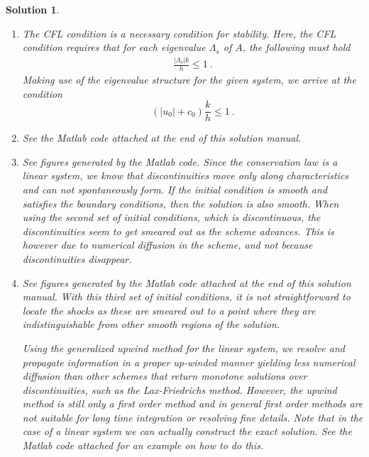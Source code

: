 \documentclass[10pt,letterpaper]{article}
\newcommand{\sqb}[1]{ \left(  {#1} \right) }
\theoremstyle{break}
\newtheorem{mysolution}{Solution}
\newenvironment{solution}{\begin{mysolution}}{\end{mysolution}}
\begin{document}
\begin{solution}
\begin{enumerate}
\begin{gather}
{\begin{array}{cc}
					(\rho_0c_0)^{-1} (-\Lambda_1^+ + \Lambda_2^+)& (\Lambda_1^+ + \Lambda_2^+)
				\end{array}}
		\end{gather}
		and
		\begin{gather}
			A^{-}=S\Lambda^{-}S^{-1}
				=\frac{1}{2}\sqb{\begin{array}{cc}
					(\Lambda_1^- + \Lambda_2^-) & \rho_{0}c_{0} (-\Lambda_1^- + \Lambda_2^-)\\
					(\rho_0c_0)^{-1} (-\Lambda_1^- + \Lambda_2^-)& (\Lambda_1^- + \Lambda_2^-)
				\end{array}}\ .
		\end{gather}


		\item
		The CFL condition is a necessary condition for stability.
		Here, the CFL condition requires that for each eigenvalue $\Lambda_{s}$ of $A$, the following must hold
		\begin{gather}
			\frac{|\Lambda_{s}|k}{h} \leq1\ .
		\end{gather}
		Making use of the eigenvalue structure for the given system, we arrive at the condition
		\begin{equation}
			\left(|u_{0}|+c_{0}\right)\frac{k}{h}\leq1\ .
		\end{equation}



		\item
		See the Matlab code attached at the end of this solution manual.


		\item
		See figures generated by the Matlab code.
		Since the conservation law is a linear system, we know that discontinuities move only along characteristics and can not spontaneously form.
		If the initial condition is smooth and satisfies the boundary conditions, then the solution is also smooth.
		When using the second set of initial conditions, which is  discontinuous, the discontinuities
		seem to get smeared out as the scheme advances.
		This is however due to numerical diffusion in the scheme, and not because discontinuities disappear.


		\item
		See figures generated by the Matlab code attached at the end of this solution manual.
		With this third set of initial conditions, it is not straightforward to locate the shocks as these are smeared out to a point where they are indistinguishable from other smooth regions of the solution.

		Using the generalized upwind method for the linear system, we resolve and propagate information in a proper up-winded manner yielding less numerical diffusion than other schemes that return monotone solutions over discontinuities, such as the Lax-Friedrichs method.
		However, the upwind method is still only a first order method and in general first order methods are not suitable for long time integration or resolving fine details.
		Note that in the case of a linear system we can actually construct the exact solution.
		See the Matlab code attached for an example on how to do this. 



\end{enumerate}
\end{solution}
\end{document}

